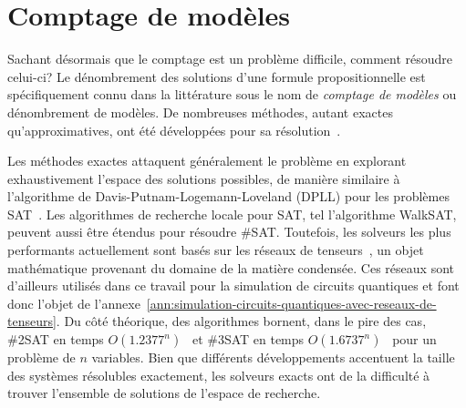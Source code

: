 
\section{Comptage de modèles}
\label{sec:comptage-de-modeles}

Sachant désormais que le comptage est un problème difficile, comment résoudre celui-ci? Le dénombrement des solutions d'une formule propositionnelle est spécifiquement connu dans la littérature sous le nom de \textit{comptage de modèles} ou dénombrement de modèles. De nombreuses méthodes, autant exactes qu'approximatives, ont été développées pour sa résolution~\cite{biereHandbookSatisfiability2009}. 

Les méthodes exactes attaquent généralement le problème en explorant exhaustivement l'espace des solutions possibles, de manière similaire à l'algorithme de Davis-Putnam-Logemann-Loveland (DPLL) pour les problèmes SAT~\cite{davisMachineProgramTheoremproving1962}. Les algorithmes de recherche locale pour SAT, tel l'algorithme WalkSAT, peuvent aussi être étendus pour résoudre \#SAT. Toutefois, les solveurs les plus performants actuellement sont basés sur les réseaux de tenseurs~\cite{kourtisFastCountingTensor2019, dudekEfficientContractionLarge2020, dudekParallelWeightedModel2021}, un objet mathématique provenant du domaine de la matière condensée. Ces réseaux sont d'ailleurs utilisés dans ce travail pour la simulation de circuits quantiques et font donc l'objet de l'annexe~\ref{ann:simulation-circuits-quantiques-avec-reseaux-de-tenseurs}. Du côté théorique, des algorithmes bornent, dans le pire des cas, \#2SAT en temps $O(1.2377^{n})$~\cite{wahlstromTighterBoundCounting2008a} et \#3SAT en temps $O(1.6737^{n})$~\cite{dahllofCountingModels2SAT2005} pour un problème de $n$ variables. Bien que différents développements accentuent la taille des systèmes résolubles exactement, les solveurs exacts ont de la difficulté à trouver l'ensemble de solutions de l'espace de recherche.

